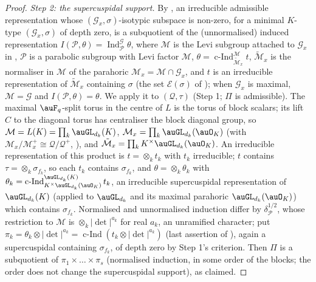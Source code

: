 \documentclass[10pt]{amsart}
\theoremstyle{definition}
\theoremstyle{remark}
\begin{document}
\begin{proof}
\emph{Step 2: the supercuspidal support.} By \cite[Theorem~6.11(2)]{MoyPrasad}, an irreducible
admissible representation whose $(\mathcal G_x,\sigma)$-isotypic subspace is non-zero, for a minimal
$K$-type $(\mathcal G_x,\sigma)$ of depth zero, is a subquotient of the (unnormalised) induced
representation $I(\mathcal P,\theta)=\operatorname{Ind}_{\mathcal P}^{\mathcal G}\theta$, where
$\mathcal M$ is the Levi subgroup attached to $\mathcal G_x$ in \cite[6.3]{MoyPrasad}, $\mathcal P$ is
a parabolic subgroup with Levi factor $\mathcal M$, $\theta=\operatorname{c-Ind}_{\tilde{\mathcal
M}_x}^{\mathcal M}t$, $\tilde{\mathcal M}_x$ is the normaliser in $\mathcal M$ of the parahoric
$\mathcal M_x=\mathcal M\cap\mathcal G_x$, and $t$ is an irreducible representation of $\tilde{\mathcal
M}_x$ containing $\sigma$ (the set $\mathcal E(\sigma)$ of \cite[6.5]{MoyPrasad}); when $\mathcal G_x$ is
maximal, $\mathcal M=\mathcal G$ and $I(\mathcal P,\theta)=\theta$. We apply it to $(\mathcal
Q,\tau)$ (Step 1; $\Pi$ is admissible). The maximal $\auF_q$-split torus in the centre of $L$ is the
torus of block scalars; its lift $C$ to the diagonal torus has centraliser the block diagonal group,
so $\mathcal M=L(K)=\prod_k\auGL_{d_k}(K)$, $\mathcal M_x=\prod_k\auGL_{d_k}(\auO_K)$ (with
$\mathcal M_x/\mathcal M_x^+\cong\mathcal Q/\mathcal Q^+$, \cite[Proposition~6.4]{MoyPrasad}), and
$\tilde{\mathcal M}_x=\prod_kK^\times\auGL_{d_k}(\auO_K)$. An irreducible representation of this
product is $t=\otimes_kt_k$ with $t_k$ irreducible; $t$ contains $\tau=\otimes_k\sigma_{f_k}$, so each
$t_k$ contains $\sigma_{f_k}$, and $\theta=\otimes_k\theta_k$ with $\theta_k=\operatorname{c-Ind}_{
K^\times\auGL_{d_k}(\auO_K)}^{\auGL_{d_k}(K)}t_k$, an irreducible supercuspidal representation of
$\auGL_{d_k}(K)$ \cite[Proposition~6.6]{MoyPrasad} (applied to $\auGL_{d_k}$ and its maximal parahoric
$\auGL_{d_k}(\auO_K)$) which contains $\sigma_{f_k}$. Normalised and unnormalised induction differ by
$\delta_{\mathcal P}^{1/2}$, whose restriction to $\mathcal M$ is $\otimes_k|\det|^{a_k}$ for real
$a_k$, an unramified character; put $\pi_k=\theta_k\otimes|\det|^{a_k}=\operatorname{c-Ind}(t_k\otimes
|\det|^{a_k})$ (last assertion of \cite[Proposition~6.6]{MoyPrasad}), again a supercuspidal containing
$\sigma_{f_k}$, of depth zero by Step 1's criterion. Then $\Pi$ is a subquotient of
$\pi_1\times\dots\times\pi_s$ (normalised induction, in some order of the blocks; the order does not
change the supercuspidal support), as claimed.


\end{proof}
\end{document}

